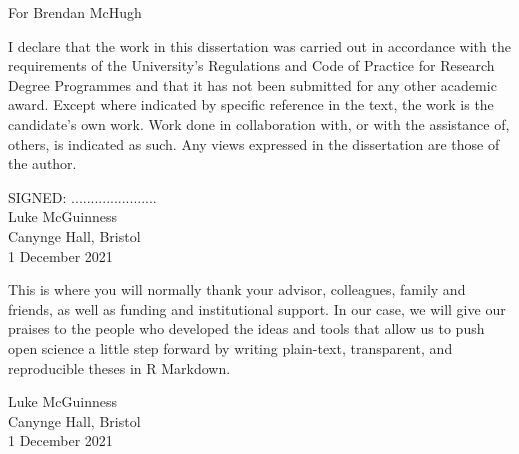 \documentclass[a4paper, nobind]{templates/ociamthesis}
\newcommand\blankpage{%
    \null
    \thispagestyle{empty}%
    \addtocounter{page}{-1}%
    \newpage}
\begin{document}
\begin{romanpages}

\maketitle

\afterpage{\blankpage}

\begin{dedication}
  For Brendan McHugh
\end{dedication}

\afterpage{\blankpage}

\begin{declaration}
 	I declare that the work in this dissertation was carried out in accordance with the requirements of the University's Regulations and Code of Practice for Research Degree Programmes and that it has not been submitted for any other academic award. Except where indicated by specific reference in the text, the work is the candidate's own work. Work done in collaboration with, or with the assistance of, others, is indicated as such. Any views expressed in the dissertation are those of the author.

\begin{flushright}
SIGNED: ...................... \\
Luke McGuinness \\
Canynge Hall, Bristol \\
1 December 2021
\end{flushright}
\end{declaration}

\afterpage{\blankpage}

\begin{acknowledgements}
 	This is where you will normally thank your advisor, colleagues, family and friends, as well as funding and institutional support. In our case, we will give our praises to the people who developed the ideas and tools that allow us to push open science a little step forward by writing plain-text, transparent, and reproducible theses in R Markdown.

\begin{flushright}
Luke McGuinness \\
Canynge Hall, Bristol \\
1 December 2021
\end{flushright}
\end{acknowledgements}


\end{romanpages}
\end{document}
